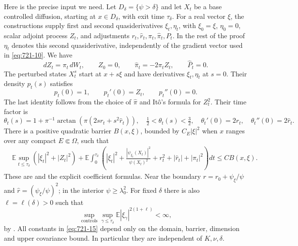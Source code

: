\documentclass[11pt,a4paper]{article}
\theoremstyle{remark}
\begin{document}
Here is the precise input we need.  Let
$D_\delta=\{\psi>\delta\}$ and let $X_t$ be a base controlled diffusion,
starting at $x\in D_\delta$, with exit time $\tau_\delta$.
For a real vector $\xi$, the constructions supply first and second
quasiderivatives $\xi_t,\eta_t$, with $\xi_0=\xi$, $\eta_0=0$,
scalar adjoint process $Z_t$, and adjustments
$r_t,\widehat r_t,\pi_t,\widehat\pi_t,P_t$.  In the rest of the proof
$\eta_t$ denotes this second quasiderivative, independently of the gradient
vector used in \eqref{eq:721-10}.  We have
\[
 dZ_t=\pi_t\,dW_t,\qquad Z_0=0,
 \qquad \widehat\pi_t=-2\pi_tZ_t,\qquad \widehat P_t=0.
\]
The perturbed states $X_t^s$ start at $x+s\xi$ and have derivatives
$\xi_t,\eta_t$ at $s=0$.  Their density $p_t(s)$ satisfies
\begin{equation}
 p_t(0)=1,\qquad p_t'(0)=Z_t,\qquad p_t''(0)=0.
 \label{eq:721-13}
\end{equation}
The last identity follows from the choice of $\widehat\pi$ and It\^o's
formula for $Z_t^2$.  Their time factor is
\begin{equation}
 \theta_t(s)=1+\pi^{-1}\arctan\!\left(\pi(2sr_t+s^2\widehat r_t)\right),
 \quad \tfrac12<\theta_t(s)<\tfrac32,
 \quad \theta_t'(0)=2r_t,
 \quad \theta_t''(0)=2\widehat r_t.
 \label{eq:721-14}
\end{equation}
There is a positive quadratic barrier $B(x,\xi)$, bounded by $C_E|\xi|^2$
when $x$ ranges over any compact $E\Subset\Omega$, such that
\begin{equation}
 \begin{split}
 &\mathbb E\sup_{t\le\tau_\delta}(|\xi_t|^2+|Z_t|^2)
 +\mathbb E\int_0^{\tau_\delta}
 \left(|\xi_t|^2+
       \frac{|\psi_{\xi_t}(X_t)|^2}{\psi(X_t)^2}
       +r_t^2+|\widehat r_t|+|\pi_t|^2\right)dt
 \le CB(x,\xi).
 \end{split}
 \label{eq:721-15}
\end{equation}
These are \cite[Lemma 7.4(1)--(3)]{ZhouBellman2015} and the explicit
coefficient formulas.  Near the boundary
$r=r_0+\psi_\xi/\psi$ and $\widehat r=(\psi_\xi/\psi)^2$;
in the interior $\psi\ge\lambda_0^2$.
For fixed $\delta$ there is also $\ell=\ell(\delta)>0$ such that
\begin{equation}
 \sup_{\text{controls}}\sup_{\gamma\le\tau_\delta}
 \mathbb E|\xi_\gamma|^{2(1+\ell)}<\infty,
 \label{eq:721-16}
\end{equation}
by \cite[Lemma 7.4(4)]{ZhouBellman2015}.
All constants in \eqref{eq:721-15} depend only on the domain, barrier, dimension and
upper covariance bound.  In particular they are independent of $K,\nu,\delta$.
\end{document}
